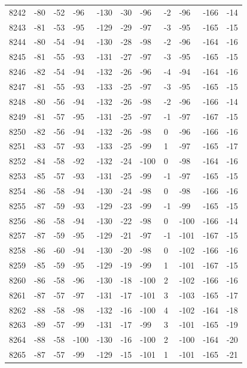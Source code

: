 \begin{table}[H]
\begin{tabular}{lllllllllll}
8242 & -80 & -52 & -96 & -130 & -30 & -96 & -2 & -96 & -166 & -14 \\
8243 & -81 & -53 & -95 & -129 & -29 & -97 & -3 & -95 & -165 & -15 \\
8244 & -80 & -54 & -94 & -130 & -28 & -98 & -2 & -96 & -164 & -16 \\
8245 & -81 & -55 & -93 & -131 & -27 & -97 & -3 & -95 & -165 & -15 \\
8246 & -82 & -54 & -94 & -132 & -26 & -96 & -4 & -94 & -164 & -16 \\
8247 & -81 & -55 & -93 & -133 & -25 & -97 & -3 & -95 & -165 & -15 \\
8248 & -80 & -56 & -94 & -132 & -26 & -98 & -2 & -96 & -166 & -14 \\
8249 & -81 & -57 & -95 & -131 & -25 & -97 & -1 & -97 & -167 & -15 \\
8250 & -82 & -56 & -94 & -132 & -26 & -98 & 0 & -96 & -166 & -16 \\
8251 & -83 & -57 & -93 & -133 & -25 & -99 & 1 & -97 & -165 & -17 \\
8252 & -84 & -58 & -92 & -132 & -24 & -100 & 0 & -98 & -164 & -16 \\
8253 & -85 & -57 & -93 & -131 & -25 & -99 & -1 & -97 & -165 & -15 \\
8254 & -86 & -58 & -94 & -130 & -24 & -98 & 0 & -98 & -166 & -16 \\
8255 & -87 & -59 & -93 & -129 & -23 & -99 & -1 & -99 & -165 & -15 \\
8256 & -86 & -58 & -94 & -130 & -22 & -98 & 0 & -100 & -166 & -14 \\
8257 & -87 & -59 & -95 & -129 & -21 & -97 & -1 & -101 & -167 & -15 \\
8258 & -86 & -60 & -94 & -130 & -20 & -98 & 0 & -102 & -166 & -16 \\
8259 & -85 & -59 & -95 & -129 & -19 & -99 & 1 & -101 & -167 & -15 \\
8260 & -86 & -58 & -96 & -130 & -18 & -100 & 2 & -102 & -166 & -16 \\
8261 & -87 & -57 & -97 & -131 & -17 & -101 & 3 & -103 & -165 & -17 \\
8262 & -88 & -58 & -98 & -132 & -16 & -100 & 4 & -102 & -164 & -18 \\
8263 & -89 & -57 & -99 & -131 & -17 & -99 & 3 & -101 & -165 & -19 \\
8264 & -88 & -58 & -100 & -130 & -16 & -100 & 2 & -100 & -164 & -20 \\
8265 & -87 & -57 & -99 & -129 & -15 & -101 & 1 & -101 & -165 & -21 \\

\end{tabular}
\end{table}
